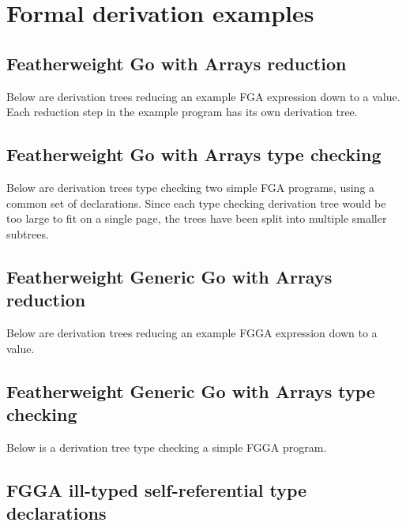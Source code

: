 \section{Formal derivation examples}

\subsection{Featherweight Go with Arrays reduction}
\label{sec:fg-derivation-example}

Below are derivation trees reducing an example FGA expression down to a value.
Each reduction step in the example program has its own derivation tree.



\subsection{Featherweight Go with Arrays type checking}
\label{sec:fg-typing-derivation-example}

Below are derivation trees type checking two simple FGA programs, using a common set
of declarations. Since each type checking derivation tree would be too large to
fit on a single page, the trees have been split into multiple smaller subtrees.



\subsection{Featherweight Generic Go with Arrays reduction}
\label{sec:fgg-derivation-example}

Below are derivation trees reducing an example FGGA expression down to a value.



\subsection{Featherweight Generic Go with Arrays type checking}
\label{sec:fgg-typing-derivation-example}

Below is a derivation tree type checking a simple FGGA program.





\subsection{FGGA ill-typed self-referential type declarations}
\label{sec:fgg-self-ref-derivation-examples}


